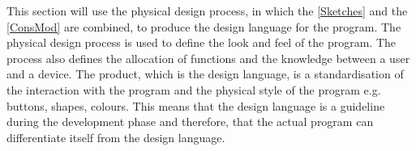 This section will use the physical design process, in which the  \cref{Sketches} and the  \cref{ConsMod} are combined, to produce the design language for the program. The physical design process is used to define the look and feel of the program. The process also defines the allocation of functions and the knowledge between a user and a device. The product, which is the design language, is a standardisation of the interaction with the program and the physical style of the program e.g. buttons, shapes, colours. This means that the design language is a guideline during the development phase and therefore, that the actual program can differentiate itself from the design language.